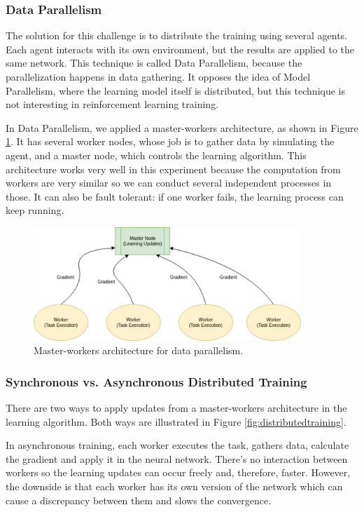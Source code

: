 \subsubsection{Data Parallelism}

The solution for this challenge is to distribute the training using several agents. Each agent interacts with its own environment, but the results are applied to the same network. This technique is called Data Parallelism, because the parallelization happens in data gathering. It opposes the idea of Model Parallelism, where the learning model itself is distributed, but this technique is not interesting in reinforcement learning training.

In Data Parallelism, we applied a master-workers architecture, as shown in Figure \ref{fig:master-worker}. It has several worker nodes, whose job is to gather data by simulating the agent, and a master node, which controls the learning algorithm. This architecture works very well in this experiment because the computation from workers are very similar so we can conduct several independent processes in those. It can also be fault tolerant: if one worker fails, the learning process can keep running.

\begin{figure}[H]
	\centering
	\includegraphics[width=0.9\textwidth]{Cap5/master-worker.eps}
	\caption{ Master-workers architecture for data parallelism.
	}
	\label{fig:master-worker}
\end{figure}

\subsubsection{Synchronous vs. Asynchronous Distributed Training}

There are two ways to apply updates from a master-workers architecture in the learning algorithm. Both ways are illustrated in Figure \ref{fig:distributedtraining}.

In asynchronous training, each worker executes the task, gathers data, calculate the gradient and apply it in the neural network. There's no interaction between workers so the learning updates can occur freely and, therefore, faster. However, the downside is that each worker has its own version of the network which can cause a discrepancy between them and slows the convergence.

